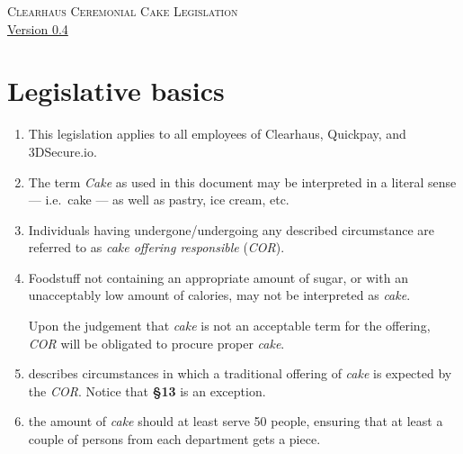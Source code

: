 \documentclass[a4paper, oneside, article]{memoir}
\newcounter{tbc}
\begin{document}
\thispagestyle{empty} %
\begin{center}
  \textsc{\huge Clearhaus Ceremonial Cake Legislation}
  \\
  {\footnotesize \href{https://semver.org/}{Version 0.4}}
\end{center}

\chapter{Legislative basics}

\begin{enumerate}[§ 1]
  \item This legislation applies to all employees of Clearhaus, Quickpay, and 3DSecure.io.


  \item The term \emph{Cake} as used in this document may be
    interpreted in a literal sense --- i.e.\ cake --- as well as pastry, ice
    cream, etc.

  \item Individuals having undergone/undergoing any described circumstance are
    referred to as \emph{cake offering responsible} (\emph{COR}).

  \item Foodstuff not containing an appropriate amount of sugar, or with an
    unacceptably low amount of calories, may not be interpreted as
    \emph{cake}.

    Upon the judgement that \emph{cake} is not an acceptable term for the
    offering, \emph{COR} will be obligated to procure proper \emph{cake}.

  \item {} describes circumstances in which a traditional
    offering of \emph{cake} is expected by the \emph{COR}. Notice that
    \textbf{§13} is an exception.
    
  \item the amount of \emph{cake} should at least serve 50 people, ensuring that at least a couple of persons from each department gets a piece.


  \setcounter{tbc}{\value{enumi}}
\end{enumerate}
\end{document}
